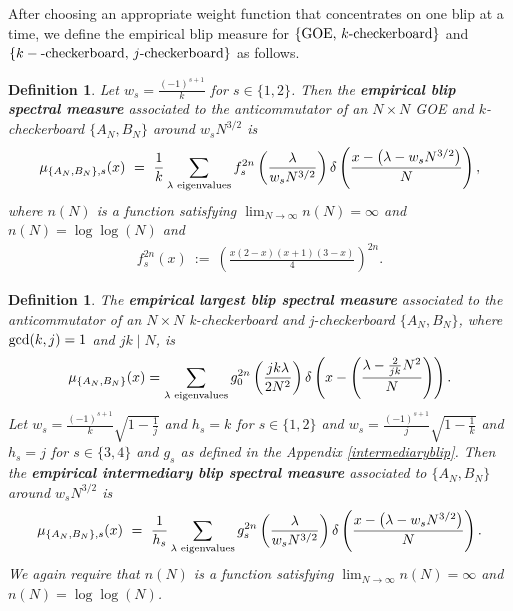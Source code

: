 \documentclass[11pt,reqno]{amsart}
\numberwithin{equation}{section}
\theoremstyle{plain}
\newtheorem{definition}[thm]{Definition}
\begin{document}

After choosing an appropriate weight function that concentrates on one blip at a time, we define the empirical blip measure for $\{\textup{GOE, }k\textup{-checkerboard}\}$ and $\{k-\textup{-checkerboard, }j\textup{-checkerboard}\}$ as follows.

\begin{definition}
Let $w_s=\frac{(-1)^{s+1}}{k}$ for $s\in \{1,2\}$. Then the \textbf{empirical blip spectral measure} associated to the anticommutator of an $N\times N$ GOE and $k$-checkerboard $\{A_N,B_N\}$ around $w_sN^{3/2}$ is
\begin{align}
\mu_{\{A_N,B_N\},s}(x) \ = \ \frac{1}{k}\sum_{\lambda\textup{ eigenvalues}}f_s^{2n}\left(\frac{\lambda}{w_sN^{3/2}}\right)\delta\left(\frac{x-\left(\lambda-w_sN^{3/2}\right)}{N}\right),
\end{align}
where $n(N)$ is a function satisfying $\lim_{N\rightarrow\infty}n(N)=\infty$ and $n(N)=\log\log(N)$ and
\begin{align}
f_s^{2n}(x) \ := \ \left(\frac{x(2-x)(x+1)(3-x)}{4}\right)^{2n}.
\end{align}
\end{definition}

\begin{definition}
The \textbf{empirical largest blip spectral measure} associated to the anticommutator of an $N\times N$ k-checkerboard and j-checkerboard  $\{A_N, B_N\}$, where $\textup{gcd}(k, j)=1$ and $jk\mid N$, is
\begin{align}
\mu_{\{A_N,B_N\}}(x)=\sum_{\lambda\textup{ eigenvalues}}g_0^{2n}\left(\frac{jk\lambda}{2N^2}\right)\delta\left(x-\left(\frac{\lambda-\frac{2}{jk}N^2}{N}\right)\right).
\end{align}
Let $w_s=\frac{(-1)^{s+1}}{k}\sqrt{1-\frac{1}{j}}$ and $h_s=k$ for $s\in \{1, 2\}$ and $w_s=\frac{(-1)^{s+1}}{j}\sqrt{1-\frac{1}{k}}$ and $h_s=j$ for $s\in \{3, 4\}$ and $g_s$ as defined in the Appendix \ref{intermediaryblip}. Then the \textbf{empirical intermediary blip spectral measure} associated to $\{A_N, B_N\}$ around $w_sN^{3/2}$ is
\begin{align}
\mu_{\{A_N, B_N\}, s}(x) \ = \ \frac{1}{h_s}\sum_{\lambda\textup{ eigenvalues}}g_s^{2n}\left(\frac{\lambda}{w_sN^{3/2}}\right)\delta\left(\frac{x-\left(\lambda-w_sN^{3/2}\right)}{N}\right).
\end{align}
We again require that $n(N)$ is a function satisfying $\lim_{N\rightarrow\infty}n(N)=\infty$ and $n(N)=\log\log(N)$.
\end{definition}
\end{document}
